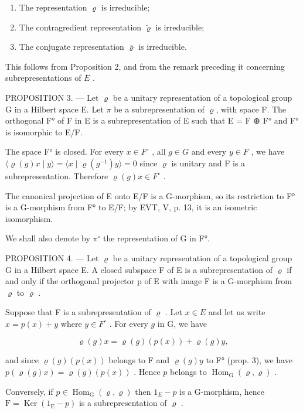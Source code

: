 \begin{enumerate}
\def\labelenumi{(\roman{enumi})}
\item
  The representation \(\varrho\) is irreducible;
\item
  The contragredient representation \(\breve{\varrho}\) is irreducible;
\item
  The conjugate representation \(\overline{\varrho}\) is irreducible.
\end{enumerate}

This follows from Proposition 2, and from the remark preceding it concerning subrepresentations of \(\overline{E}\) .

PROPOSITION 3. --- Let \(\varrho\) be a unitary representation of a topological group G in a Hilbert space E. Let \(\pi\) be a subrepresentation of \(\varrho\), with space F. The orthogonal F° of F in E is a subrepresentation of E such that E = F ⊕ F° and F° is isomorphic to E/F.

The space F° is closed. For every \(x \in F^{\circ}\) , all \(g \in G\) and every \(y \in F\) , we have \(\langle \varrho(g)x \mid y \rangle = \langle x \mid \varrho(g^{-1})y \rangle = 0\) since \(\varrho\) is unitary and F is a subrepresentation. Therefore \(\varrho(g)x \in F^{\circ}\) .

The canonical projection of E onto E/F is a G-morphism, so its restriction to F° is a G-morphism from F° to E/F; by EVT, V, p. 13, it is an isometric isomorphism.

We shall also denote by \(\pi^{\circ}\) the representation of G in F°.

PROPOSITION 4. --- Let \(\varrho\) be a unitary representation of a topological group G in a Hilbert space E. A closed subspace F of E is a subrepresentation of \(\varrho\) if and only if the orthogonal projector p of E with image F is a G-morphism from \(\varrho\) to \(\varrho\) .

Suppose that F is a subrepresentation of \(\varrho\) . Let \(x \in E\) and let us write \(x = p(x) + y\) where \(y \in F^{\circ}\) . For every \(g\) in G, we have

\[
\varrho (g) x = \varrho (g) (p (x)) + \varrho (g) y,
\]

and since \(\varrho(g)(p(x))\) belongs to F and \(\varrho(g)y\) to F° (prop. 3), we have \(p(\varrho(g)x) = \varrho(g)(p(x))\) . Hence \(p\) belongs to \(\operatorname{Hom}_{\mathrm{G}}(\varrho, \varrho)\) .

Conversely, if \(p \in \operatorname{Hom}_{\mathrm{G}}(\varrho, \varrho)\) then \(1_{E} - p\) is a G-morphism, hence \(\mathrm{F} = \operatorname{Ker}(1_{\mathrm{E}} - p)\) is a subrepresentation of \(\varrho\) .

